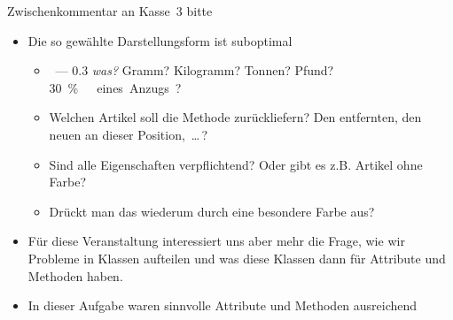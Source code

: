 {\iffull
{\AddonFrame
\begin{frame}{Zwischenkommentar an Kasse~3 bitte}
    \begin{itemize}[<+(1)->]
        \itemsep5pt
        \item Die so gewählte Darstellungsform ist suboptimal \begin{itemize}
            \itemsep3pt
            \item {}~--- \num{0.3} \textit{was?} Gramm? Kilogramm? Tonnen? Pfund? \qty{30}\percent\ eines Anzugs?
            \item Welchen Artikel soll die Methode  zurückliefern? Den entfernten, den neuen an dieser Position,~\ldots\,?
            \item Sind alle Eigenschaften verpflichtend? Oder gibt es z.B. Artikel ohne Farbe?
            \item Drückt man das wiederum durch eine besondere Farbe aus?
        \end{itemize}
        \item Für diese Veranstaltung interessiert uns aber mehr die Frage, wie wir Probleme in Klassen aufteilen und was diese Klassen dann für Attribute und Methoden haben.
        \item In dieser Aufgabe waren  sinnvolle Attribute und Methoden ausreichend
    \end{itemize}
\end{frame}
}
\fi
}




